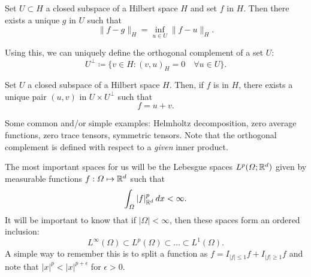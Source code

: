 \begin{theorem}
    Set $U\subset H$ a closed subspace of a Hilbert space $H$ and set $f$ in $H$. Then there exists a unique $g$ in $U$ such that
        $$ \|f - g \|_H = \inf_{u\in U} \| f - u\|_H. $$
\end{theorem}
Using this, we can uniquely define the orthogonal complement of a set $U$: 
    $$ U^\perp \coloneqq \{v\in H: (v, u)_H = 0 \quad\forall u\in U\}. $$
\begin{theorem}
    Set $U$ a closed subspace of a Hilbert space $H$. Then, if $f$ is in $H$, there exists a unique pair $(u,v)$ in $U\times U^\perp$ such that 
        $$f = u + v.$$
\end{theorem}
Some common and/or simple examples: Helmholtz decomposition, zero average functions, zero trace tensors, symmetric tensors. Note that the orthogonal complement is defined with respect to a \emph{given} inner product.


The most important spaces for us will be the Lebesgue spaces $L^p(\Omega;\mathbb{R}^d)$ given by measurable functions $f:\Omega \mapsto \mathbb{R}^d$ such that
    $$ \int_\Omega |f|_{\mathbb{R}^d}^p\,dx < \infty. $$
It will be important to know that if $|\Omega|<\infty$, then these spaces form an ordered inclusion: 
    $$ L^\infty(\Omega) \subset L^p(\Omega) \subset ... \subset L^1(\Omega). $$
A simple way to remember this is to split a function as $f = I_{|f|\leq 1}f + I_{|f|\geq 1}f$ and note that $|x|^p < |x|^{p+\epsilon}$ for $\epsilon > 0$. 




